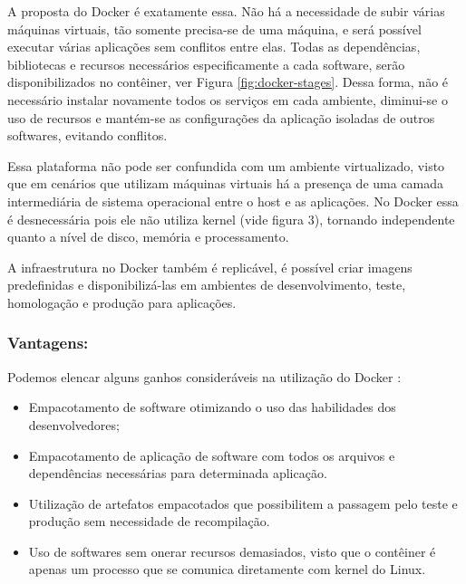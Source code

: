 A proposta do Docker é exatamente essa. Não há a necessidade de subir várias máquinas virtuais, tão somente precisa-se de uma máquina, e será possível executar várias aplicações sem conflitos entre elas. Todas as dependências, bibliotecas e recursos necessários especificamente a cada software, serão disponibilizados no contêiner, ver Figura \ref{fig:docker-stages}. Dessa forma, não é necessário instalar novamente todos os serviços em cada ambiente, diminui-se o uso de recursos e mantém-se as configurações da aplicação isoladas de outros softwares, evitando conflitos. \cite{scampini}

Essa plataforma não pode ser confundida com um ambiente virtualizado, visto que em cenários que utilizam máquinas virtuais há a presença de uma camada intermediária de sistema operacional entre o host e as aplicações. No Docker essa é desnecessária pois ele não utiliza kernel (vide figura 3), tornando independente quanto a nível de disco, memória e processamento.\cite{mouat}

A infraestrutura no Docker também é replicável, é possível criar imagens predefinidas e disponibilizá-las em ambientes de desenvolvimento, teste, homologação e produção para aplicações.\cite{mattiaskane}

\subsubsection{Vantagens:}
Podemos elencar alguns ganhos consideráveis na utilização do Docker :
\begin{itemize}
\item Empacotamento de software otimizando o uso das habilidades dos desenvolvedores;
\item Empacotamento de aplicação de software com todos os arquivos e dependências necessárias para determinada aplicação.
\item Utilização de artefatos empacotados que possibilitem a passagem pelo teste e produção sem necessidade de recompilação.
\item Uso de softwares sem onerar recursos demasiados, visto que o contêiner é apenas um processo que se comunica diretamente com kernel do Linux.
\end{itemize}


